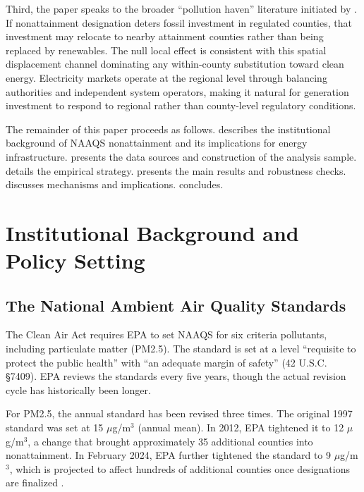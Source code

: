 \documentclass[12pt]{article}
\begin{document}
Third, the paper speaks to the broader ``pollution haven'' literature initiated by \citet{jaffe1995environmental}. If nonattainment designation deters fossil investment in regulated counties, that investment may relocate to nearby attainment counties rather than being replaced by renewables. The null local effect is consistent with this spatial displacement channel dominating any within-county substitution toward clean energy. Electricity markets operate at the regional level through balancing authorities and independent system operators, making it natural for generation investment to respond to regional rather than county-level regulatory conditions.

The remainder of this paper proceeds as follows.  describes the institutional background of NAAQS nonattainment and its implications for energy infrastructure.  presents the data sources and construction of the analysis sample.  details the empirical strategy.  presents the main results and robustness checks.  discusses mechanisms and implications.  concludes.


\section{Institutional Background and Policy Setting}
\label{sec:background}

\subsection{The National Ambient Air Quality Standards}

The Clean Air Act requires EPA to set NAAQS for six criteria pollutants, including particulate matter (PM2.5). The standard is set at a level ``requisite to protect the public health'' with ``an adequate margin of safety'' (42 U.S.C. \S7409). EPA reviews the standards every five years, though the actual revision cycle has historically been longer.

For PM2.5, the annual standard has been revised three times. The original 1997 standard was set at 15 $\mu$g/m$^3$ (annual mean). In 2012, EPA tightened it to 12 $\mu$g/m$^3$, a change that brought approximately 35 additional counties into nonattainment. In February 2024, EPA further tightened the standard to 9 $\mu$g/m$^3$, which is projected to affect hundreds of additional counties once designations are finalized \citep{EPA2024NAAQS}.
\end{document}
